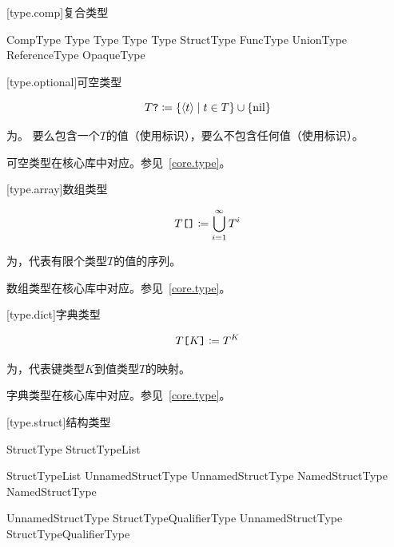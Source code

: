 [type.comp]{复合类型}

\begin{bnf}{CompType}
    Type  \br
    Type \terminal{[} \terminal{]} \br
    Type \terminal{[} Type \terminal{]} \br
    StructType \br
    FuncType \br
    UnionType \br
    ReferenceType \br
    OpaqueType
\end{bnf}

[type.optional]{可空类型}

$$ T\texttt{?} \coloneqq \{ \langle t \rangle \mid t \in T \} \cup \{ \mathrm{nil} \} $$

\pnum
{}为。
要么包含一个$T$的值（使用标识），要么不包含任何值（使用标识）。

\pnum
可空类型在核心库中对应。参见~\ref{core.type}。

[type.array]{数组类型}

$$ T\texttt{[]} \coloneqq \bigcup^\infty_{i=1} T^i $$

\pnum
{}为，代表有限个类型$T$的值的序列。

\pnum
数组类型在核心库中对应。参见~\ref{core.type}。

[type.dict]{字典类型}

$$ T\texttt{[}K\texttt{]} \coloneqq T^K $$

\pnum
{}为，代表键类型$K$到值类型$T$的映射。

\pnum
字典类型在核心库中对应。参见~\ref{core.type}。

[type.struct]{结构类型}

\begin{bnf}{StructType}
    \terminal{(} \terminal{)} \br
    \terminal{(} StructTypeList \terminal{,}\bnfq \terminal{)}
\end{bnf}

\begin{bnf}{StructTypeList}
    UnnamedStructType \br
    UnnamedStructType \terminal{,} NamedStructType \br
    NamedStructType
\end{bnf}

\begin{bnf}{UnnamedStructType}
    StructTypeQualifier\bnfs Type \br
    UnnamedStructType \terminal{,} StructTypeQualifier\bnfs Type
\end{bnf}


